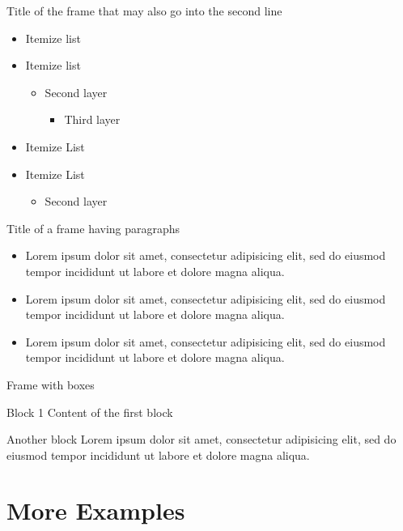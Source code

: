 \documentclass[10pt, aspectratio=1610]{beamer}
\begin{document}
\begin{frame}{Title of the frame that may also go into the second line}
	\begin{itemize}
		\item Itemize list 
		\item Itemize list
			\begin{itemize}
				\item Second layer 
					\begin{itemize}
						\item Third layer 
					\end{itemize}
			\end{itemize}
		\item Itemize List 
		\item Itemize List 
			\begin{itemize}
				\item Second layer
			\end{itemize}
	\end{itemize}
\end{frame}

\begin{frame}{Title of a frame having paragraphs}
	\begin{itemize}
		\item Lorem ipsum dolor sit amet, consectetur adipisicing elit, sed do eiusmod tempor incididunt ut labore et dolore magna aliqua.
		\item Lorem ipsum dolor sit amet, consectetur adipisicing elit, sed do eiusmod tempor incididunt ut labore et dolore magna aliqua.
		\item Lorem ipsum dolor sit amet, consectetur adipisicing elit, sed do eiusmod tempor incididunt ut labore et dolore magna aliqua.
	\end{itemize}
\end{frame}

\begin{frame}{Frame with boxes}
	\begin{block}{Block 1}
		Content of the first block
	\end{block}
	\begin{block}{Another block}
		Lorem ipsum dolor sit amet, consectetur adipisicing elit, sed do eiusmod tempor incididunt ut labore et dolore magna aliqua.
	\end{block}
\end{frame}

\section{More Examples}
\end{document}
